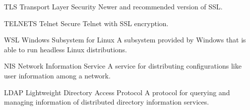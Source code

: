 %
{TLS}{}%
{Transport Layer Security}{}%
{Newer and recommended version of \gls{SSL}.}

%
{TELNETS}{}%
{Telnet Secure}{}%
{Telnet with \gls{SSL} encryption.}

%
{WSL}{}%
{Windows Subsystem for Linux}{}%
{A subsystem provided by Windows that is able to run headless \gls{Linux} distributions.}

%
{NIS}{}%
{Network Information Service}{}%
{A service for distributing configurations like user information among a network.}

%
{LDAP}{}%
{Lightweight Directory Access Protocol}{}%
{A protocol for querying and managing information of distributed directory information services.}



